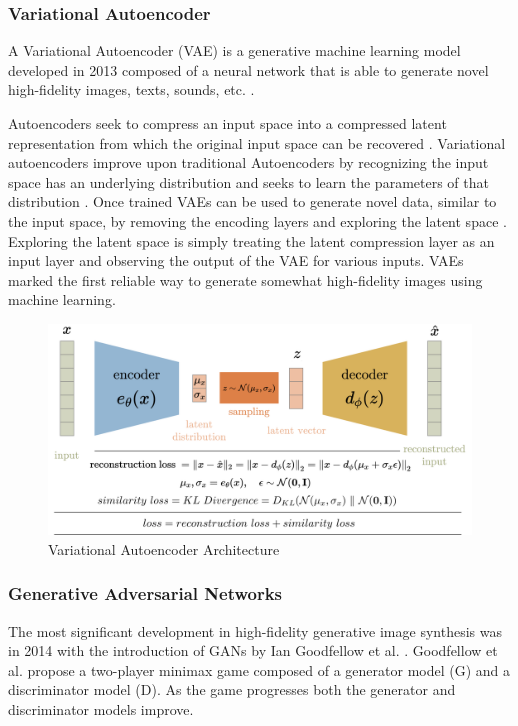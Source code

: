 \documentclass[%
 reprint,
 amsmath,amssymb,
 aps,
]{revtex4-2}
\begin{document}
\subsubsection{Variational Autoencoder}
A Variational Autoencoder (VAE) is a generative machine learning model developed in 2013 composed of a neural network that is able to generate novel high-fidelity images, texts, sounds, etc. \cite{kingma2014autoencoding}.


Autoencoders seek to compress an input space into a compressed latent representation from which the original input space can be recovered \cite{kingma2014autoencoding}. Variational autoencoders improve upon traditional Autoencoders by recognizing the input space has an underlying distribution and seeks to learn the parameters of that distribution \cite{kingma2014autoencoding}. Once trained VAEs can be used to generate novel data, similar to the input space, by removing the encoding layers and exploring the latent space \cite{kingma2014autoencoding}. Exploring the latent space is simply treating the latent compression layer as an input layer and observing the output of the VAE for various inputs. VAEs marked the first reliable way to generate somewhat high-fidelity images using machine learning\cite{rocca_2021}.

\begin{figure}[h]
    \includegraphics[width=0.9\columnwidth]{vae.png}
    \caption{\label{fig:vae} Variational Autoencoder Architecture \cite{rocca_2021}}
\end{figure}

\subsubsection{Generative Adversarial Networks}
\label{VG}
The most significant development in high-fidelity generative image synthesis was in 2014 with the introduction of  GANs by Ian Goodfellow et al. \cite{goodfellow2014generative}. Goodfellow et al. propose a two-player minimax game composed of a generator model (G) and a discriminator model (D). As the game progresses both the generator and discriminator models improve.
\end{document}
